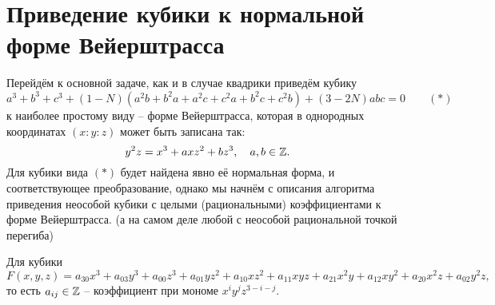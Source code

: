 \section*{Приведение кубики к нормальной форме Вейерштрасса}



Перейдём к основной задаче, как и в случае квадрики приведём кубику 
\[
    a^3 + b^3 + c^3 + (1 - N) (a^2 b + b^2 a + a^2 c + c^2 a + b^2 c + c^2 b)
    + (3 - 2 N) a b c = 0 \qquad (*)
\] 
к наиболее простому виду -- форме Вейерштрасса, которая в однородных
координатах \((x : y : z)\) может быть записана так:
\[
y^2 z = x^3 + a x z^2 + b z^3, \quad a, b \in \mathbb{Z}
.\]
Для кубики вида \((*)\) будет найдена явно её нормальная форма, и
соответствующее преобразование, однако мы начнём с описания алгоритма
приведения неособой  кубики с целыми (рациональными)
коэффициентами к форме Вейерштрасса.
(а на самом деле любой с неособой рациональной точкой
перегиба)

Для кубики 
\[
F(x, y, z) = a_{30} x^3 + a_{03} y^3 + a_{00} z^3 + a_{01} y z^2 + a_{10} x z^2 +
a_{11} x y z + a_{21} x^2 y + a_{12} x y^2 + a_{20} x^2 z + a_{02} y^2 z
,\] 
то есть \(a_{ij} \in \mathbb{Z}\) -- коэффициент при мономе \(x^{i} y^{j} z^{3 - i -
j}\). 



